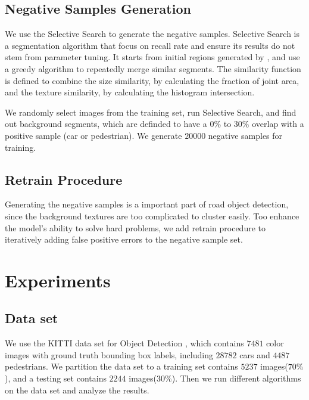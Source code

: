 \documentclass{article} %
\begin{document}
\subsection{Negative Samples Generation}

We use the Selective Search \cite{van2011segmentation} to generate the negative samples. Selective Search is a segmentation algorithm that focus on recall rate and ensure its results do not stem from parameter tuning. It starts from initial regions generated by \cite{felzenszwalb2004efficient}, and use a greedy algorithm to repeatedly merge similar segments. The similarity function is defined to combine the size similarity, by calculating the fraction of joint area, and the texture similarity, by calculating the histogram intersection.

We randomly select images from the training set, run Selective Search, and find out background segments, which are definded to have a $0\%$ to $30\%$ overlap with a positive sample (car or pedestrian). We generate $20000$ negative samples for training. 

\subsection{Retrain Procedure}

Generating the negative samples is a important part of road object detection, since the background textures are too complicated to cluster easily. Too enhance the model's ability to solve hard problems, we add retrain procedure \cite{felzenszwalb2010object} to iteratively adding false positive errors to the negative sample set.

\section{Experiments}

\subsection{Data set}

We use the KITTI data set for Object Detection \cite{Geiger2012CVPR}, which contains $7481$ color images with ground truth bounding box labels, including $28782$ cars and $4487$ pedestrians. We partition the data set to a training set contains $5237$ images($70\%$), and a testing set contains $2244$ images($30\%$). Then we run different algorithms on the data set and analyze the results.
\end{document}
